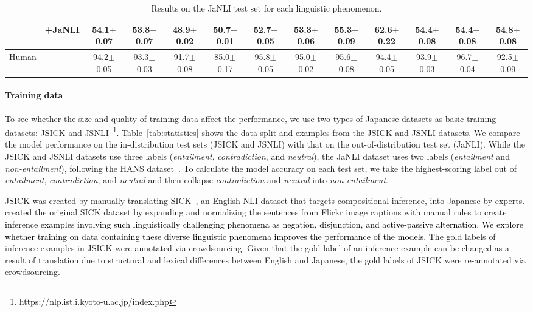 \documentclass[11pt]{article}
\newcommand{\km}[1]{\textcolor{black}{#1}}
\begin{document}
\begin{table*}[h!]
{\begin{tabular}{ll|ccccccccccc}
 & +JaNLI & 54.1{\small $\pm$0.07} &
 53.8{\small $\pm$0.07} &
 48.9{\small $\pm$0.02} &
 50.7{\small $\pm$0.01} & 52.7{\small $\pm$0.05} & 53.3{\small $\pm$0.06} & 55.3{\small $\pm$0.09} & 62.6{\small $\pm$0.22} & 54.4{\small $\pm$0.08} & 54.4{\small $\pm$0.08} & 54.8{\small $\pm$0.08} \\
\hline
Human &  &94.2{\small $\pm$0.05}&
93.3{\small $\pm$0.03} &
91.7{\small $\pm$0.08} &
85.0{\small $\pm$0.17} & 95.8{\small $\pm$0.05} & 95.0{\small $\pm$0.02} & 95.6{\small $\pm$0.08} & 94.4{\small $\pm$0.05} & 93.9{\small $\pm$0.03} & 96.7{\small $\pm$0.04} & 92.5{\small $\pm$0.09} \\ \hline
\end{tabular}
}
\caption{Results on the JaNLI test set for each linguistic phenomenon.} 
\label{tab:results-pheno}
\end{table*}

\paragraph{Training data}
To see whether the size and quality of training data affect the performance, we use two types of Japanese datasets as basic training datasets: JSICK and JSNLI~\cite{jsnli}\footnote{https://nlp.ist.i.kyoto-u.ac.jp/index.php}.
Table~\ref{tab:statistics} shows the data split and examples from the JSICK and JSNLI datasets.
We compare the model performance on the in-distribution test sets (JSICK and JSNLI) with that on the out-of-distribution test set (JaNLI).
While the JSICK and JSNLI datasets use three labels (\textit{entailment}, \textit{contradiction}, and \textit{neutral}), the JaNLI dataset uses two labels (\textit{entailment} and \textit{non-entailment}),
following the HANS dataset~\cite{mccoy-etal-2019-right}.
To calculate the model accuracy on each test set, we take the highest-scoring label out of \textit{entailment}, \textit{contradiction}, and \textit{neutral}
and then collapse \textit{contradiction} and \textit{neutral} into \textit{non-entailment}.

JSICK was created by manually translating SICK~\cite{marelli-etal-2014-sick}, an English NLI dataset that targets compositional inference, into Japanese by experts.
\citet{marelli-etal-2014-sick} created the original SICK dataset by expanding and normalizing the sentences from Flickr image captions with manual rules to create
\km{inference examples involving
such linguistically challenging phenomena as negation, disjunction,
and active-passive alternation.
We explore whether training on data containing these diverse linguistic phenomena
improves the performance of the models.}
The gold labels of inference examples in JSICK were annotated via crowdsourcing.
Given that the gold label of an inference example can be changed
as a result of translation due to structural and lexical differences
between English and Japanese,
the gold labels of JSICK were re-annotated via crowdsourcing.
\end{document}
